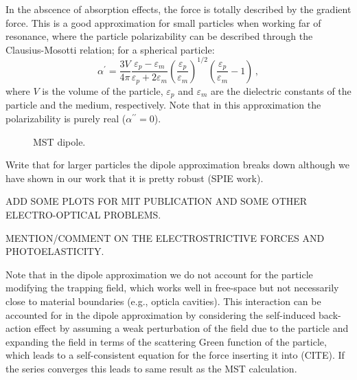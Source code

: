 In the abscence of absorption effects, the force is totally described 
by the gradient force. This is a good approximation for small particles
when working far of resonance, where the particle polarizability can be 
described through the Clausius-Mosotti relation; for a spherical particle:
\begin{equation}
    \alpha^{\prime}=\frac{3 V}{4 \pi} \frac{\varepsilon_p-\varepsilon_m}{\varepsilon_p+2 \varepsilon_m} \left(\frac{\varepsilon_p}{\varepsilon_m}\right)^{1 / 2} \left(\frac{\varepsilon_p}{\varepsilon_m}-1\right)\,,
\end{equation}
where $V$ is the volume of the particle, $\varepsilon_p$ and $\varepsilon_m$ are the
dielectric constants of the particle and the medium, respectively. Note that in this 
approximation the polarizability is purely real ($\alpha^{\prime \prime} = 0$).

\begin{figure}[tb]
    \centering
    \caption{MST dipole.}
    \label{fig:MST_dipole}
\end{figure}


Write that for larger particles the dipole approximation breaks down
although we have shown in our work that it is pretty robust (SPIE work).

ADD SOME PLOTS FOR MIT PUBLICATION AND SOME OTHER ELECTRO-OPTICAL PROBLEMS.

MENTION/COMMENT ON THE ELECTROSTRICTIVE FORCES AND PHOTOELASTICITY.

Note that in the dipole approximation we do not account for the particle modifying
the trapping field, which works well in free-space but not necessarily close to material
boundaries (e.g., opticla cavities). This interaction can be accounted for in the dipole
approximation by considering the self-induced back-action effect by assuming a weak
perturbation of the field due to the particle and expanding the field in terms of 
the scattering Green function of the particle, which leads to a self-consistent
equation for the force inserting it into (CITE). If the series converges this leads 
to same result as the MST calculation. 

